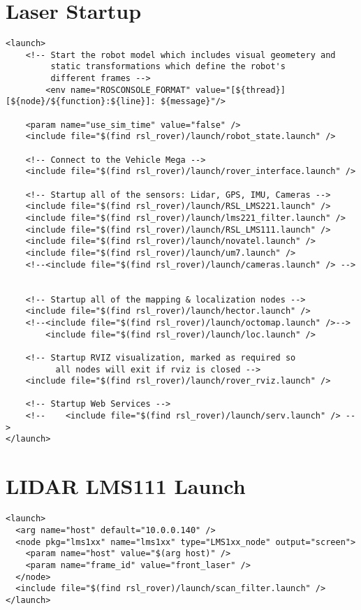 \section{Laser Startup}
\begin{verbatim}
<launch>
	<!-- Start the robot model which includes visual geometery and
	     static transformations which define the robot's
	     different frames -->	
        <env name="ROSCONSOLE_FORMAT" value="[${thread}] [${node}/${function}:${line}]: ${message}"/>

	<param name="use_sim_time" value="false" />
	<include file="$(find rsl_rover)/launch/robot_state.launch" />

	<!-- Connect to the Vehicle Mega -->
	<include file="$(find rsl_rover)/launch/rover_interface.launch" /> 

	<!-- Startup all of the sensors: Lidar, GPS, IMU, Cameras -->
	<include file="$(find rsl_rover)/launch/RSL_LMS221.launch" /> 
	<include file="$(find rsl_rover)/launch/lms221_filter.launch" />
	<include file="$(find rsl_rover)/launch/RSL_LMS111.launch" />
	<include file="$(find rsl_rover)/launch/novatel.launch" />
	<include file="$(find rsl_rover)/launch/um7.launch" />
	<!--<include file="$(find rsl_rover)/launch/cameras.launch" /> -->


	<!-- Startup all of the mapping & localization nodes -->
	<include file="$(find rsl_rover)/launch/hector.launch" />
	<!--<include file="$(find rsl_rover)/launch/octomap.launch" />-->
        <include file="$(find rsl_rover)/launch/loc.launch" />

	<!-- Startup RVIZ visualization, marked as required so
	      all nodes will exit if rviz is closed -->
	<include file="$(find rsl_rover)/launch/rover_rviz.launch" />

	<!-- Startup Web Services -->
	<!--	<include file="$(find rsl_rover)/launch/serv.launch" /> -->
</launch>
\end{verbatim}


\section{LIDAR LMS111 Launch}
\begin{verbatim}
<launch>
  <arg name="host" default="10.0.0.140" />
  <node pkg="lms1xx" name="lms1xx" type="LMS1xx_node" output="screen">
    <param name="host" value="$(arg host)" />
    <param name="frame_id" value="front_laser" />
  </node>
  <include file="$(find rsl_rover)/launch/scan_filter.launch" />
</launch>
\end{verbatim}


